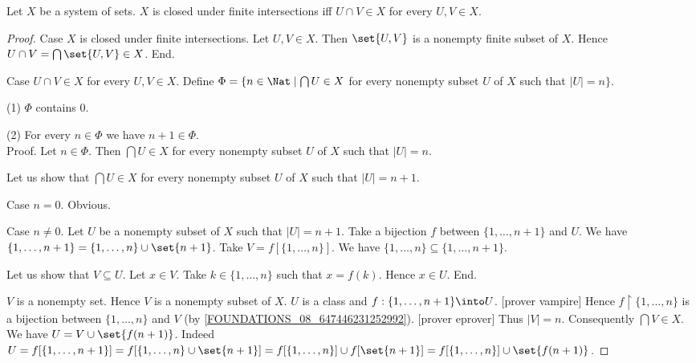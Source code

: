 \documentclass[../arithmetic.tex]{subfiles}
\begin{document}
  \begin{forthel}
    \begin{proposition}
      Let $X$ be a system of sets.
      $X$ is closed under finite intersections iff $U \cap V \in X$ for every
      $U, V \in X$.
    \end{proposition}
    \begin{proof}
      Case $X$ is closed under finite intersections.
        Let $U, V \in X$.
        Then $\set{U, V}$ is a nonempty finite subset of $X$.
        Hence $U \cap V = \bigcap \set{U, V} \in X$.
      End.

      Case $U \cap V \in X$ for every $U, V \in X$.
        Define $\Phi = \{ n \in \Nat \mid \bigcap U \in X$ for every nonempty
        subset $U$ of $X$ such that $|U| = n \}$.

        (1) $\Phi$ contains $0$.

        (2) For every $n \in \Phi$ we have $n + 1 \in \Phi$. \\
        Proof.
          Let $n \in \Phi$.
          Then $\bigcap U \in X$ for every nonempty subset $U$ of $X$ such that
          $|U| = n$.

          Let us show that $\bigcap U \in X$ for every nonempty subset $U$ of
          $X$ such that $|U| = n + 1$.

            Case $n = 0$. Obvious.

            Case $n \neq 0$.
              Let $U$ be a nonempty subset of $X$ such that $|U| = n + 1$.
              Take a bijection $f$ between $\{1, \dots, n + 1 \}$ and $U$.
              We have $\{ 1, \dots, n + 1 \} = \{ 1, \dots, n \} \cup \set{n + 1}$.
              Take $V = f[\{ 1, \dots, n \}]$.
              We have $\{ 1, \dots, n \} \subseteq \{ 1, \dots, n + 1 \}$.

              Let us show that $V \subseteq U$.
                Let $x \in V$.
                Take $k \in \{ 1, \dots, n \}$ such that $x = f(k)$.
                Hence $x \in U$.
              End.

              $V$ is a nonempty set.
              Hence $V$ is a nonempty subset of $X$.
              $U$ is a class and $f : \{ 1, \dots, n + 1 \} \into U$.
              [prover vampire]
              Hence $f \restriction \{ 1, \dots, n \}$ is a bijection between
              $\{ 1, \dots, n \}$ and $V$
              (by \cref{FOUNDATIONS_08_647446231252992}).
              [prover eprover]
              Thus $|V| = n$.
              Consequently $\bigcap V \in X$.
              We have $U = V \cup \set{f(n + 1)}$.
              Indeed $U = f[\{ 1, \dots, n + 1 \}]
                = f[\{ 1, \dots, n \} \cup \set{n + 1}]
                = f[\{ 1, \dots, n \}] \cup f[\set{n + 1}]
                = f[\{ 1, \dots, n \}] \cup \set{f(n + 1)}$.


\end{proof}
\end{forthel}
\end{document}
